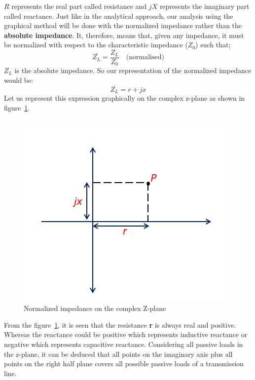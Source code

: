 $R$ represents the real part called resistance and $jX$ represents the imaginary part called reactance. Just like in the analytical approach, our analysis using the graphical method will be done with the normalized impedance rather than the \textbf{absolute impedance}. It, therefore, means that, given any impedance, it must be normalized with respect to the characteristic impedance ($Z_0$) such that;
\begin{equation*}
\bar{Z_L}=\frac{Z_L}{Z_0} \quad \text{(normalised)}
\end{equation*}
$Z_L$ is the absolute impedance. So our representation of the normalized impedance would be:
\begin{equation*}
\bar{Z_L}= r + jx
\end{equation*}
Let us represent this expression graphically on the complex z-plane as shown in figure~\ref{fig:transline2}.
\begin{figure}[h]
\center\includegraphics[width=0.8\linewidth]{graphics/Zplane}
\caption{Normalized impedance on the complex Z-plane}
\label{fig:transline2}
\end{figure}

From the figure~\ref{fig:transline2}, it is seen that the resistance \textbf{r} is always real and positive. Whereas the reactance could be positive which represents inductive reactance or negative which represents capacitive reactance. Considering all passive loads in the z-plane, it can be deduced that all points on the imaginary axis plus all points on the right half plane covers all possible passive loads of a transmission line.

